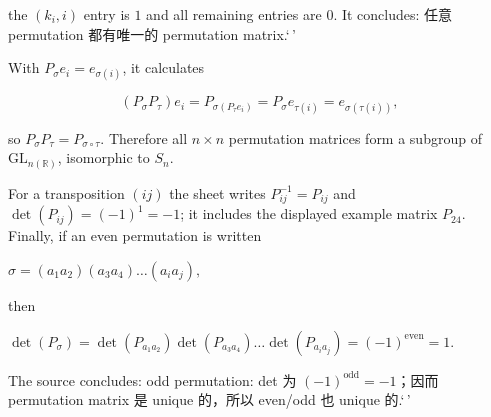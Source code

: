 the \(\left( {k_{i},i} \right)\) entry is \(1\) and all remaining entries are \(0\). It concludes: 任意 permutation 都有唯一的 permutation matrix.`\,'

With \(P_{\sigma}e_{i} = e_{\sigma{(i)}}\), it calculates

\[\left( {P_{\sigma}P_{\tau}} \right)e_{i} = P_{\sigma{({P_{\tau}e_{i}})}} = P_{\sigma}e_{\tau{(i)}} = e_{\sigma{({\tau{(i)}})}},\]

so \(P_{\sigma}P_{\tau} = P_{\sigma \circ \tau}\). Therefore all \(n \times n\) permutation matrices form a subgroup of \(\text{GL}_{n{(\mathbb{R})}}\), isomorphic to \(S_{n}\).

For a transposition \(\left( {ij} \right)\) the sheet writes \(P_{ij}^{- 1} = P_{ij}\) and \(\det\left( P_{ij} \right) = \left( {- 1} \right)^{1} = - 1\); it includes the displayed example matrix \(P_{24}\). Finally, if an even permutation is written

\(\sigma = \left( {a_{1}a_{2}} \right)\left( {a_{3}a_{4}} \right)\ldots\left( {a_{i}a_{j}} \right),\)

then

\(\det\left( P_{\sigma} \right) = \det\left( P_{a_{1}a_{2}} \right)\det\left( P_{a_{3}a_{4}} \right)\ldots\det\left( P_{a_{i}a_{j}} \right) = \left( {- 1} \right)^{\text{even}} = 1.\)

The source concludes: odd permutation: det 为 \(\left( {- 1} \right)^{\text{odd}} = - 1\)；因而 permutation matrix 是 unique 的，所以 even/odd 也 unique 的.`\,'
